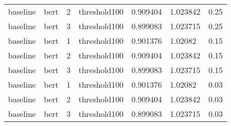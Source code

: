 \begin{tabular}{lllllll}
             baseline &  bert &   2 & threshold100 &  0.909404 &  1.023842 &   0.25 \\
             baseline &  bert &   3 & threshold100 &  0.899083 &  1.023715 &   0.25 \\
             baseline &  bert &   1 & threshold100 &  0.901376 &   1.02082 &   0.15 \\
             baseline &  bert &   2 & threshold100 &  0.909404 &  1.023842 &   0.15 \\
             baseline &  bert &   3 & threshold100 &  0.899083 &  1.023715 &   0.15 \\
             baseline &  bert &   1 & threshold100 &  0.901376 &   1.02082 &   0.03 \\
             baseline &  bert &   2 & threshold100 &  0.909404 &  1.023842 &   0.03 \\
             baseline &  bert &   3 & threshold100 &  0.899083 &  1.023715 &   0.03 \\
\bottomrule
\end{tabular}
